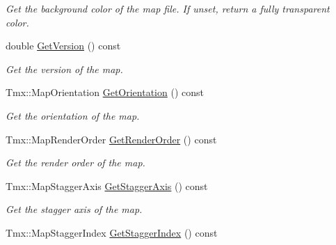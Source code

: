 \begin{DoxyCompactItemize}
\begin{DoxyCompactList}\small\item\em Get the background color of the map file. If unset, return a fully transparent color. \end{DoxyCompactList}\item 
\hypertarget{classTmx_1_1Map_a0293a108d6dad2581b7db37adeee1474}{double \hyperlink{classTmx_1_1Map_a0293a108d6dad2581b7db37adeee1474}{Get\-Version} () const }\label{classTmx_1_1Map_a0293a108d6dad2581b7db37adeee1474}

\begin{DoxyCompactList}\small\item\em Get the version of the map. \end{DoxyCompactList}\item 
\hypertarget{classTmx_1_1Map_a7cc9f5a5d57b0d118d12f759e1b479b6}{Tmx\-::\-Map\-Orientation \hyperlink{classTmx_1_1Map_a7cc9f5a5d57b0d118d12f759e1b479b6}{Get\-Orientation} () const }\label{classTmx_1_1Map_a7cc9f5a5d57b0d118d12f759e1b479b6}

\begin{DoxyCompactList}\small\item\em Get the orientation of the map. \end{DoxyCompactList}\item 
\hypertarget{classTmx_1_1Map_aafe9c6f1b5ed6649145875f4c525b2bf}{Tmx\-::\-Map\-Render\-Order \hyperlink{classTmx_1_1Map_aafe9c6f1b5ed6649145875f4c525b2bf}{Get\-Render\-Order} () const }\label{classTmx_1_1Map_aafe9c6f1b5ed6649145875f4c525b2bf}

\begin{DoxyCompactList}\small\item\em Get the render order of the map. \end{DoxyCompactList}\item 
\hypertarget{classTmx_1_1Map_a442d8d11d30de6c5f72e300636969766}{Tmx\-::\-Map\-Stagger\-Axis \hyperlink{classTmx_1_1Map_a442d8d11d30de6c5f72e300636969766}{Get\-Stagger\-Axis} () const }\label{classTmx_1_1Map_a442d8d11d30de6c5f72e300636969766}

\begin{DoxyCompactList}\small\item\em Get the stagger axis of the map. \end{DoxyCompactList}\item 
\hypertarget{classTmx_1_1Map_a6fce5949f2c6c42764f1eb2dbdee8007}{Tmx\-::\-Map\-Stagger\-Index \hyperlink{classTmx_1_1Map_a6fce5949f2c6c42764f1eb2dbdee8007}{Get\-Stagger\-Index} () const }\label{classTmx_1_1Map_a6fce5949f2c6c42764f1eb2dbdee8007}


\end{DoxyCompactItemize}
